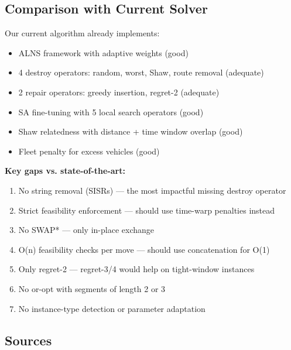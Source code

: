 \documentclass[twocolumn,10pt,letterpaper]{article}
\begin{document}
\subsection{Comparison with Current Solver}

Our current algorithm already implements:

\begin{itemize}
\setlength{\itemsep}{0pt}
\setlength{\parskip}{0pt}
  \item ALNS framework with adaptive weights (good)
  \item 4 destroy operators: random, worst, Shaw, route removal (adequate)
  \item 2 repair operators: greedy insertion, regret-2 (adequate)
  \item SA fine-tuning with 5 local search operators (good)
  \item Shaw relatedness with distance + time window overlap (good)
  \item Fleet penalty for excess vehicles (good)
\end{itemize}

\textbf{Key gaps vs. state-of-the-art:}

\begin{enumerate}
\setlength{\itemsep}{0pt}
\setlength{\parskip}{0pt}
  \item No string removal (SISRs) --- the most impactful missing destroy operator
  \item Strict feasibility enforcement --- should use time-warp penalties instead
  \item No SWAP* --- only in-place exchange
  \item O(n) feasibility checks per move --- should use concatenation for O(1)
  \item Only regret-2 --- regret-3/4 would help on tight-window instances
  \item No or-opt with segments of length 2 or 3
  \item No instance-type detection or parameter adaptation
\end{enumerate}

\subsection{Sources}
\end{document}
